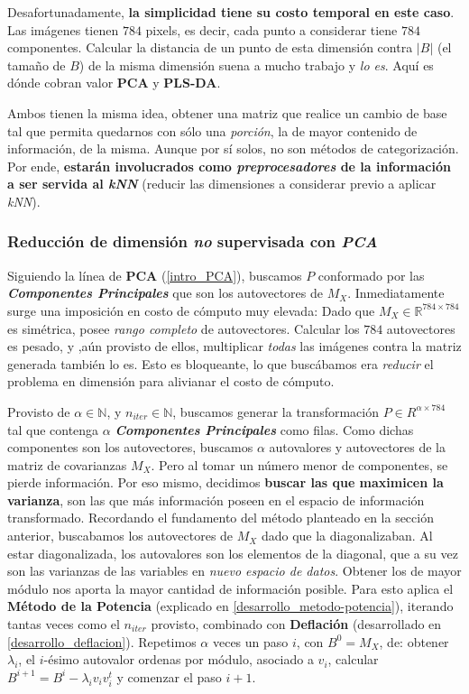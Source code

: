 Desafortunadamente, \textbf{la simplicidad tiene su costo temporal en este caso}. Las im\'agenes tienen $784$ pixels, es decir, cada punto a considerar tiene $784$ componentes. Calcular la distancia de un punto de esta dimensi\'on contra \textit{$\vert B \vert$} (el tamaño de $B$) de la misma dimensi\'on suena a mucho trabajo y \textit{lo es}. Aqu\'i es d\'onde cobran valor \textbf{PCA} y \textbf{PLS-DA}.

Ambos tienen la misma idea, obtener una matriz que realice un cambio de base tal que permita quedarnos con s\'olo una \textit{porci\'on}, la de mayor contenido de informaci\'on, de la misma. Aunque por s\'i solos, no son m\'etodos de categorizaci\'on. Por ende, \textbf{estar\'an involucrados como \textit{preprocesadores} de la informaci\'on a ser servida al \textit{kNN}} (reducir las dimensiones a considerar previo a aplicar \textit{kNN}).

\subsubsection{Reducci\'on de dimensi\'on \textit{no} supervisada con \textit{PCA}}

Siguiendo la l\'inea de \textbf{PCA} (\ref{intro_PCA}), buscamos $P$ conformado por las \textit{\textbf{Componentes Principales}} que son los autovectores de $M_{X}$. Inmediatamente surge una imposici\'on en costo de c\'omputo muy elevada: Dado que $M_{X} \in \mathbb{R}^{784 \times 784}$ es sim\'etrica, posee \textit{rango completo} de autovectores. Calcular los $784$ autovectores es pesado, y ,a\'un provisto de ellos, multiplicar \textit{todas} las im\'agenes contra la matriz generada tambi\'en lo es. Esto es bloqueante, lo que busc\'abamos era \textit{reducir} el problema en dimensi\'on para alivianar el costo de c\'omputo.

Provisto de $\alpha \in \mathbb{N}$, y $n_{iter} \in \mathbb{N}$, buscamos generar la transformaci\'on $P \in R^{\alpha \times 784}$ tal que contenga $\alpha$ \textbf{\textit{Componentes Principales}} como filas.
Como dichas componentes son los autovectores, buscamos $\alpha$ autovalores y autovectores de la matriz de covarianzas $M_{X}$. Pero al tomar un n\'umero menor de componentes, se pierde informaci\'on. Por eso mismo, decidimos \textbf{buscar las que maximicen la varianza}, son las que m\'as informaci\'on poseen en el espacio de informaci\'on transformado. Recordando el fundamento del m\'etodo planteado en la secci\'on anterior, buscabamos los autovectores de $M_{X}$ dado que la diagonalizaban. Al estar diagonalizada, los autovalores son los elementos de la diagonal, que a su vez son las varianzas de las variables en \textit{nuevo espacio de datos}. Obtener los de mayor m\'odulo nos aporta la mayor cantidad de informaci\'on posible. Para esto aplica el \textbf{M\'etodo de la Potencia} (explicado en \ref{desarrollo_metodo-potencia}), iterando tantas veces como el $n_{iter}$ provisto, combinado con \textbf{Deflaci\'on} (desarrollado en \ref{desarrollo_deflacion}). Repetimos $\alpha$ veces un paso $i$, con $B^0 = M_{X}$, de: obtener $\lambda_{i}$, el $i$-\'esimo autovalor ordenas por m\'odulo, asociado a $v_{i}$, calcular $B^{i + 1} = B^{i} - \lambda_{i}v_{i}v_{i}^{t}$ y comenzar el paso $i+1$.


